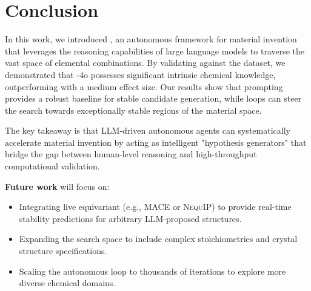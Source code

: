 \section{Conclusion}
\label{sec:conclusion}

In this work, we introduced \ours, an autonomous framework for material invention that leverages the reasoning capabilities of large language models to traverse the vast space of elemental combinations. By validating against the \gnome dataset, we demonstrated that \gpt-4o possesses significant intrinsic chemical knowledge, outperforming \randomsearch with a medium effect size. Our results show that \zeroshot prompting provides a robust baseline for stable candidate generation, while \activelearning loops can steer the search towards exceptionally stable regions of the material space.

The key takeaway is that LLM-driven autonomous agents can systematically accelerate material invention by acting as intelligent "hypothesis generators" that bridge the gap between human-level reasoning and high-throughput computational validation.

{\bf Future work} will focus on:
\begin{itemize}[leftmargin=*,itemsep=0pt,topsep=0pt]
    \item Integrating live equivariant \gnns (e.g., \textsc{MACE} or \textsc{NequIP}) to provide real-time stability predictions for arbitrary LLM-proposed structures.
    \item Expanding the search space to include complex stoichiometries and crystal structure specifications.
    \item Scaling the autonomous loop to thousands of iterations to explore more diverse chemical domains.
\end{itemize}
